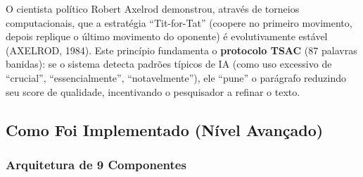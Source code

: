 \documentclass[12pt,a4paper]{article}
\begin{document}
O cientista político Robert Axelrod demonstrou, através de torneios computacionais, que a estratégia ``Tit-for-Tat'' (coopere no primeiro movimento, depois replique o último movimento do oponente) é evolutivamente estável (AXELROD, 1984). Este princípio fundamenta o \textbf{protocolo TSAC} (87 palavras banidas): se o sistema detecta padrões típicos de IA (como uso excessivo de ``crucial'', ``essencialmente'', ``notavelmente''), ele ``pune'' o parágrafo reduzindo seu score de qualidade, incentivando o pesquisador a refinar o texto.

\subsection{Como Foi Implementado (Nível Avançado)}

\subsubsection{Arquitetura de 9 Componentes}
\end{document}

